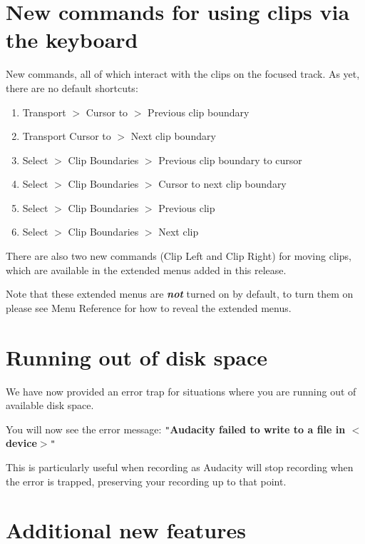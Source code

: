 \documentclass[twocolumn]{book}
\begin{document}

\section{New commands for using clips via the keyboard}


New commands, all of which interact with the clips on the focused track. As yet, there are no default shortcuts:
\begin{enumerate}
\item Transport \mbox{$>$} Cursor to \mbox{$>$} Previous clip boundary
\item Transport Cursor to \mbox{$>$} Next clip boundary
\item Select \mbox{$>$} Clip Boundaries \mbox{$>$} Previous clip boundary to cursor 
\item Select \mbox{$>$} Clip Boundaries \mbox{$>$} Cursor to next clip boundary 
\item Select \mbox{$>$} Clip Boundaries \mbox{$>$} Previous clip 
\item Select \mbox{$>$} Clip Boundaries \mbox{$>$} Next clip 
\end{enumerate}
There are also two new commands (Clip Left and Clip Right) for moving clips, which are available in the extended menus added in this release.

Note that these extended menus are \textit{\textbf{not}} turned on by default, to turn them on please see Menu Reference for how to reveal the extended menus.



\section{Running out of disk space}


We have now provided an error trap for situations where you are running out of available disk space.

You will now see the error message:
\texttt{{}"{}}\textbf{Audacity failed to write to a file in \mbox{$<$}device\mbox{$>$}}\texttt{{}"{}}

This is particularly useful when recording as Audacity will stop recording when the error is trapped, preserving your recording up to that point.



\section{Additional new features}
\end{document}
